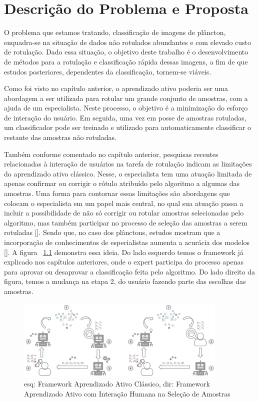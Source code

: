 \chapter{Descrição do Problema e Proposta}
\label{cap:Proposta}

O problema que estamos tratando, classificação de imagens de plâncton, enquadra-se na situação de dados não rotulados abundantes e com elevado custo de rotulação. Dado essa situação, o objetivo deste trabalho é o desenvolvimento de métodos para a rotulação e classificação rápida dessas imagens, a fim de que estudos posteriores, dependentes da classificação, tornem-se viáveis. 

Como foi visto no capítulo anterior, o aprendizado ativo poderia ser uma abordagem a ser utilizada para rotular um grande conjunto de amostras, com a ajuda de um especialista. Neste processo, o objetivo é a minimização do esforço de interação do usuário. Em seguida, uma vez em posse de amostras rotuladas, um classificador pode ser treinado e utilizado para automaticamente classificar o restante das amostras não rotuladas. 

Também conforme comentado no capítulo anterior, pesquisas recentes relacionadas à interação de usuários na tarefa de rotulação indicam as limitações do aprendizado ativo clássico. Nesse, o especialista tem uma atuação limitada de apenas confirmar ou corrigir o rótulo atribuído pelo algoritmo a algumas das amostras. Uma forma para contornar essas limitações são abordagens que colocam o especialista em um papel mais central, no qual sua atuação passa a incluir a possibilidade de não só corrigir ou rotular amostras selecionadas pelo algoritmo, mas também participar no processo de seleção das amostras a serem rotuladas [\cite{castro2009human, kottke2018other}]. Sendo que, no caso dos plânctons, estudos mostram que a incorporação de conhecimentos de especialistas aumenta a acurácia dos modelos [\cite{benfield2007rapid}]. A figura ~\ref{fig:frameworks_AL} demonstra essa ideia. Do lado esquerdo temos o framework já explicado nos capítulos anteriores, onde o expert participa do processo apenas para aprovar ou desaprovar a classificação feita pelo algoritmo. Do lado direito da figura, temos a mudança na etapa 2, do usuário fazendo parte das escolhas das amostras.

\begin{figure}
  \centering
  \includegraphics[width=0.9\textwidth]{figures/Frameworks_Active_Learning.png}
  \caption{esq: Framework Aprendizado Ativo Clássico, dir: Framework Aprendizado Ativo com Interação Humana na Seleção de Amostras}
  \label{fig:frameworks_AL}
\end{figure}



